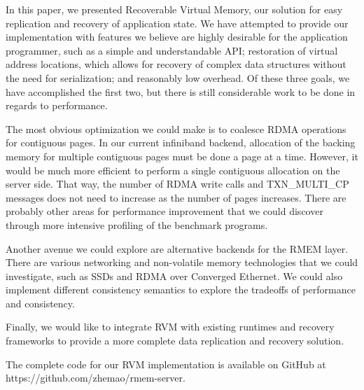 In this paper, we presented Recoverable Virtual Memory, our solution for easy
replication and recovery of application state. We have attempted to provide our
implementation with features we believe are highly desirable for the
application programmer, such as a simple and understandable API; restoration of
virtual address locations, which allows for recovery of complex data structures
without the need for serialization; and reasonably low overhead.  Of these
three goals, we have accomplished the first two, but there is still
considerable work to be done in regards to performance.

The most obvious optimization we could make is to coalesce RDMA operations for
contiguous pages. In our current infiniband backend, allocation of the backing
memory for multiple contiguous pages must be done a page at a time.  However,
it would be much more efficient to perform a single contiguous allocation on
the server side. That way, the number of RDMA write calls and TXN\_MULTI\_CP
messages does not need to increase as the number of pages increases. There are
probably other areas for performance improvement that we could discover through
more intensive profiling of the benchmark programs.

Another avenue we could explore are alternative backends for the RMEM layer.
There are various networking and non-volatile memory technologies that we could
investigate, such as SSDs and RDMA over Converged Ethernet. We could also
implement different consistency semantics to explore the tradeoffs of
performance and consistency.

Finally, we would like to integrate RVM with existing runtimes and recovery
frameworks to provide a more complete data replication and recovery solution.

The complete code for our RVM implementation is available on GitHub at
https://github.com/zhemao/rmem-server.
